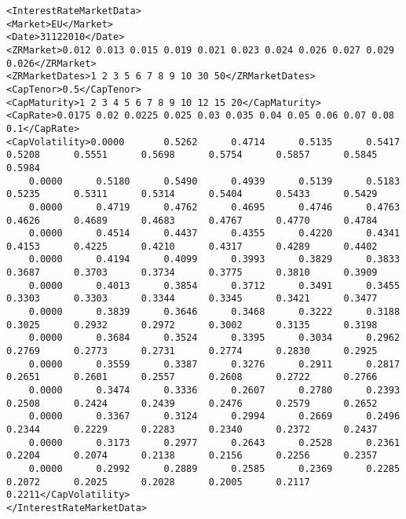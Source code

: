 {\footnotesize{
\begin{verbatim}
<InterestRateMarketData>
<Market>EU</Market>
<Date>31122010</Date>
<ZRMarket>0.012 0.013 0.015 0.019 0.021 0.023 0.024 0.026 0.027 0.029 0.026</ZRMarket>
<ZRMarketDates>1 2 3 5 6 7 8 9 10 30 50</ZRMarketDates>
<CapTenor>0.5</CapTenor>
<CapMaturity>1 2 3 4 5 6 7 8 9 10 12 15 20</CapMaturity>
<CapRate>0.0175 0.02 0.0225 0.025 0.03 0.035 0.04 0.05 0.06 0.07 0.08 0.1</CapRate>
<CapVolatility>0.0000	    0.5262	    0.4714	    0.5135	    0.5417	    0.5208	    0.5551	    0.5698	    0.5754	    0.5857	    0.5845	    0.5984
	0.0000	    0.5180	    0.5490	    0.4939	    0.5139	    0.5183	    0.5235	    0.5311	    0.5314	    0.5404	    0.5433	    0.5429
	0.0000	    0.4719	    0.4762	    0.4695	    0.4746	    0.4763	    0.4626	    0.4689	    0.4683	    0.4767	    0.4770	    0.4784
	0.0000	    0.4514	    0.4437	    0.4355	    0.4220	    0.4341	    0.4153	    0.4225	    0.4210	    0.4317	    0.4289	    0.4402
	0.0000	    0.4194	    0.4099	    0.3993	    0.3829	    0.3833	    0.3687	    0.3703	    0.3734	    0.3775	    0.3810	    0.3909
	0.0000	    0.4013	    0.3854	    0.3712	    0.3491	    0.3455	    0.3303	    0.3303	    0.3344	    0.3345	    0.3421	    0.3477
	0.0000	    0.3839	    0.3646	    0.3468	    0.3222	    0.3188	    0.3025	    0.2932	    0.2972	    0.3002	    0.3135	    0.3198
	0.0000	    0.3684	    0.3524	    0.3395	    0.3034	    0.2962	    0.2769	    0.2773	    0.2731	    0.2774	    0.2830	    0.2925
	0.0000	    0.3559	    0.3387	    0.3276	    0.2911	    0.2817	    0.2651	    0.2601	    0.2557	    0.2608	    0.2722	    0.2766
	0.0000	    0.3474	    0.3336	    0.2607	    0.2780	    0.2393	    0.2508	    0.2424	    0.2439	    0.2476	    0.2579	    0.2652
	0.0000	    0.3367	    0.3124	    0.2994	    0.2669	    0.2496	    0.2344	    0.2229	    0.2283	    0.2340	    0.2372	    0.2437
	0.0000	    0.3173	    0.2977	    0.2643	    0.2528	    0.2361	    0.2204	    0.2074	    0.2138	    0.2156	    0.2256	    0.2357
	0.0000	    0.2992	    0.2889	    0.2585	    0.2369	    0.2285	    0.2072	    0.2025	    0.2028	    0.2005	    0.2117      0.2211</CapVolatility>
</InterestRateMarketData>
\end{verbatim}
}}





